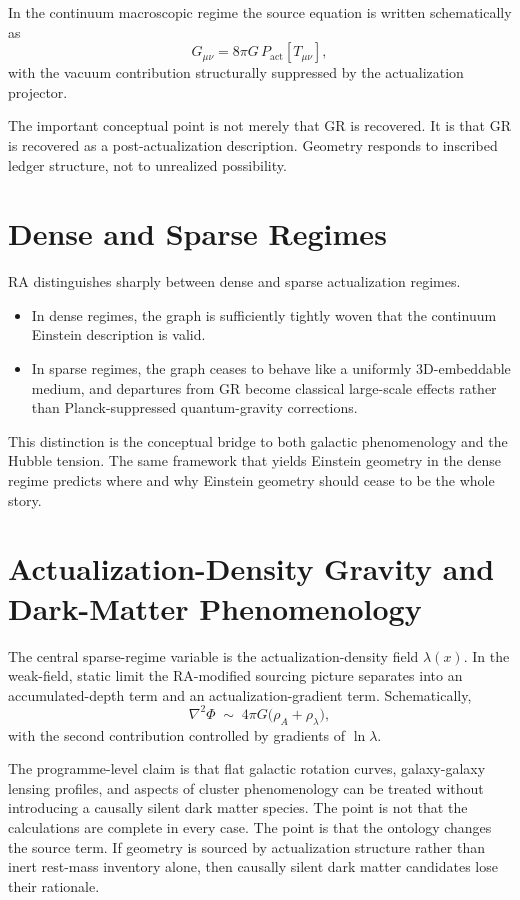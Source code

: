 \documentclass[11pt]{article}
\begin{document}
In the continuum macroscopic regime the source equation is written schematically as
\begin{equation}
G_{\mu\nu}=8\pi G\, P_{\mathrm{act}}[T_{\mu\nu}],
\end{equation}
with the vacuum contribution structurally suppressed by the actualization projector.

The important conceptual point is not merely that GR is recovered. It is that GR is recovered as a post-actualization description. Geometry responds to inscribed ledger structure, not to unrealized possibility.

\section{Dense and Sparse Regimes}
RA distinguishes sharply between dense and sparse actualization regimes.
\begin{itemize}
    \item In dense regimes, the graph is sufficiently tightly woven that the continuum Einstein description is valid.
    \item In sparse regimes, the graph ceases to behave like a uniformly 3D-embeddable medium, and departures from GR become classical large-scale effects rather than Planck-suppressed quantum-gravity corrections.
\end{itemize}

This distinction is the conceptual bridge to both galactic phenomenology and the Hubble tension. The same framework that yields Einstein geometry in the dense regime predicts where and why Einstein geometry should cease to be the whole story.

\section{Actualization-Density Gravity and Dark-Matter Phenomenology}
The central sparse-regime variable is the actualization-density field $\lambda(x)$. In the weak-field, static limit the RA-modified sourcing picture separates into an accumulated-depth term and an actualization-gradient term. Schematically,
\begin{equation}
\nabla^2\Phi\;\sim\;4\pi G\bigl(\rho_A+\rho_\lambda\bigr),
\end{equation}
with the second contribution controlled by gradients of $\ln\lambda$.

The programme-level claim is that flat galactic rotation curves, galaxy-galaxy lensing profiles, and aspects of cluster phenomenology can be treated without introducing a causally silent dark matter species. The point is not that the calculations are complete in every case. The point is that the ontology changes the source term. If geometry is sourced by actualization structure rather than inert rest-mass inventory alone, then causally silent dark matter candidates lose their rationale.
\end{document}
